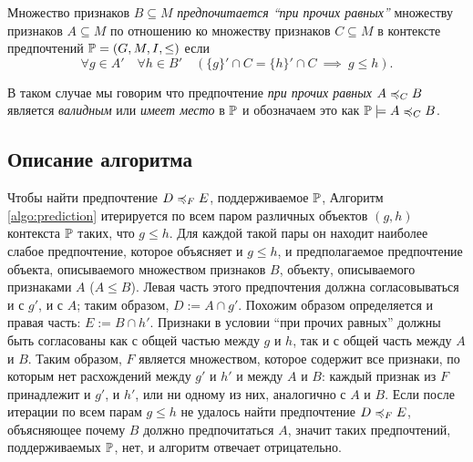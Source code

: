 		\begin{definition}
			Множество признаков $B \subseteq M$ \emph{предпочитается \enquote{при прочих равных}} множеству признаков $A \subseteq M$ по отношению ко множеству признаков $C \subseteq M$ в контексте предпочтений $\mathbb{P} = (G, M, I, \leq)$ если 
			\begin{equation}
			\forall g \in A' \quad \forall h \in B' \quad (\{g\}' \cap C = \{h\}' \cap C \: \implies \: g \leq h).
			\end{equation}
			
			В таком случае мы говорим что предпочтение \emph{при прочих равных} $A \preccurlyeq_{C} B$ является \emph{валидным} или \emph{имеет место} в $\mathbb{P}$ и обозначаем это как $\mathbb{P} \models A \preccurlyeq_{C} B$.
		\end{definition}
	
	\subsection{Описание алгоритма}
		Чтобы найти предпочтение $D \preccurlyeq_{F} E$, поддерживаемое $\mathbb{P}$, Алгоритм \ref{algo:prediction} итерируется по всем паром различных объектов $(g, h)$ контекста $\mathbb{P}$ таких, что $g \leq h$. Для каждой такой пары он находит наиболее слабое предпочтение, которое объясняет и $g \leq h$, и предполагаемое предпочтение объекта, описываемого множеством признаков $B$, объекту, описываемого признаками $A$ ($A \leq B$). Левая часть этого предпочтения должна согласовываться и с $g'$, и с $A$; таким образом, $D := A \cap g'$. Похожим образом определяется и правая часть: $E := B \cap h'$. Признаки в условии \enquote{при прочих равных} должны быть согласованы как с общей частью между $g$ и $h$, так и с общей часть между $A$ и $B$. Таким образом, $F$ является множеством, которое содержит все признаки, по которым нет расхождений между $g'$ и $h'$ и между $A$ и $B$: каждый признак из $F$ принадлежит и $g'$, и $h'$, или ни одному из них, аналогично с $A$ и $B$. %
		Если после итерации по всем парам $g \leq h$ не удалось найти предпочтение $D \preccurlyeq_{F} E$, объясняющее почему $B$ должно предпочитаться $A$, значит таких предпочтений, поддерживаемых $\mathbb{P}$, нет, и алгоритм отвечает отрицательно.
	
